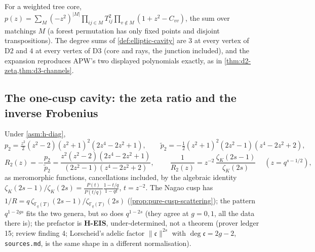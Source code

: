 \begin{lemma}
\label{lem:tree-matching-determinant}
For a weighted tree core, $p(z) = \sum_{M}(-z^2)^{|M|}\prod_{ij\in M}T_{ij}^2\prod_{v\notin M}(1+z^2-C_{vv})$,
the sum over matchings $M$ (a forest permutation has only fixed points and disjoint transpositions). The
degree sums of \cref{def:elliptic-cavity} are $3$ at every vertex of $\mathrm{D2}$ and $4$ at every vertex of
$\mathrm{D3}$ (core and rays, the junction included), and the expansion reproduces APW's two displayed
polynomials exactly, as in \cref{thm:d2-zeta,thm:d3-channels}.
\end{lemma}

\subsection{The one-cusp cavity: the zeta ratio and the inverse Frobenius}

\begin{theorem}
\label{thm:d2-zeta}
Under \cref{asm:h-diag},
\[
p_2 = \tfrac{z^2}{2}(z^2-2)(z^2+1)^2(2z^4-2z^2+1),\qquad
\tilde p_2 = -\tfrac12(z^2+1)^2(2z^2-1)(z^4-2z^2+2),
\]
\[
R_2(z) = -\frac{p_2}{\tilde p_2} = \frac{z^2(z^2-2)(2z^4-2z^2+1)}{(2z^2-1)(z^4-2z^2+2)},\qquad
\boxed{\ \frac1{R_2(z)} = z^{-2}\,\frac{\zeta_K(2s-1)}{\zeta_K(2s)}\ }\quad(z = q^{s-1/2}),
\]
as meromorphic functions, cancellations included, by the algebraic identity
$\zeta_K(2s-1)/\zeta_K(2s) = \frac{P(t)}{P(t/q)}\frac{1-t/q}{1-qt}$, $t = z^{-2}$. The Nagao cusp has
$1/R = q\,\zeta_{\mathbb F_q(T)}(2s-1)/\zeta_{\mathbb F_q(T)}(2s)$ (\cref{prop:pure-cusp-scattering}); the
pattern $q^{1-2gs}$ fits the two genera, but so does $q^{1-2s}$ (they agree at $g = 0,1$, all the data there is); the
prefactor is \textbf{H-EIS}, under-determined, not a theorem (prover ledger 15; review finding 4; Lorscheid's
adelic factor $\|\mathfrak c\|^{2s}$ with $\deg\mathfrak c = 2g-2$, \texttt{sources.md}, is the same shape in a
different normalisation).
\end{theorem}

